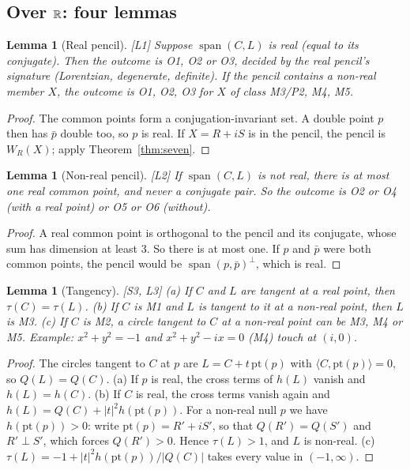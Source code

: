 \documentclass[11pt]{article}
\newtheorem{lemma}[theorem]{Lemma}\newtheorem{corollary}[theorem]{Corollary}
\theoremstyle{definition}\newtheorem{definition}[theorem]{Definition}\newtheorem{remark}[theorem]{Remark}\newtheorem{example}[theorem]{Example}
\newcommand{\ip}[2]{\langle #1,#2\rangle}\newcommand{\pt}{\mathrm{pt}}\newcommand{\Qd}{\mathcal{Q}}
\newcommand{\chk}[1]{\hfill{\footnotesize\textsf{[#1]}}}
\newcommand{\cls}[1]{\textsf{#1}}
\begin{document}
\subsection{Over $\mathbb{R}$: four lemmas}
\begin{lemma}[Real pencil]\label{lem:real}\chk{L1}
Suppose $\operatorname{span}(C,L)$ is real (equal to its conjugate). Then the outcome is O1, O2 or O3, decided by the real pencil's signature (Lorentzian, degenerate, definite). If the pencil contains a non-real member $X$, the outcome is O1, O2, O3 for $X$ of class \cls{M3}/\cls{P2}, \cls{M4}, \cls{M5}.
\end{lemma}
\begin{proof}
The common points form a conjugation-invariant set. A double point $p$ then has $\bar p$ double too, so $p$ is real. If $X=R+iS$ is in the pencil, the pencil is $W_R(X)$; apply Theorem~\ref{thm:seven}.
\end{proof}
\begin{lemma}[Non-real pencil]\label{lem:nonreal}\chk{L2}
If $\operatorname{span}(C,L)$ is not real, there is at most one real common point, and never a conjugate pair. So the outcome is O2 or O4 (with a real point) or O5 or O6 (without).
\end{lemma}
\begin{proof}
A real common point is orthogonal to the pencil and its conjugate, whose sum has dimension at least $3$. So there is at most one. If $p$ and $\bar p$ were both common points, the pencil would be $\operatorname{span}(p,\bar p)^\perp$, which is real.
\end{proof}
\begin{lemma}[Tangency]\label{lem:tangent}\chk{S3, L3}
(a) If $C$ and $L$ are tangent at a real point, then $\tau(C)=\tau(L)$.
(b) If $C$ is \cls{M1} and $L$ is tangent to it at a non-real point, then $L$ is \cls{M3}.
(c) If $C$ is \cls{M2}, a circle tangent to $C$ at a non-real point can be \cls{M3}, \cls{M4} or \cls{M5}. Example: $x^2+y^2=-1$ and $x^2+y^2-ix=0$ (\cls{M4}) touch at $(i,0)$.
\end{lemma}
\begin{proof}
The circles tangent to $C$ at $p$ are $L=C+t\,\pt(p)$ with $\ip C{\pt(p)}=0$, so $Q(L)=Q(C)$.
(a) If $p$ is real, the cross terms of $h(L)$ vanish and $h(L)=h(C)$.
(b) If $C$ is real, the cross terms vanish again and $h(L)=Q(C)+|t|^2h(\pt(p))$. For a non-real null $p$ we have $h(\pt(p))>0$: write $\pt(p)=R'+iS'$, so that $Q(R')=Q(S')$ and $R'\perp S'$, which forces $Q(R')>0$. Hence $\tau(L)>1$, and $L$ is non-real.
(c) $\tau(L)=-1+|t|^2h(\pt(p))/|Q(C)|$ takes every value in $(-1,\infty)$.
\end{proof}
\end{document}
